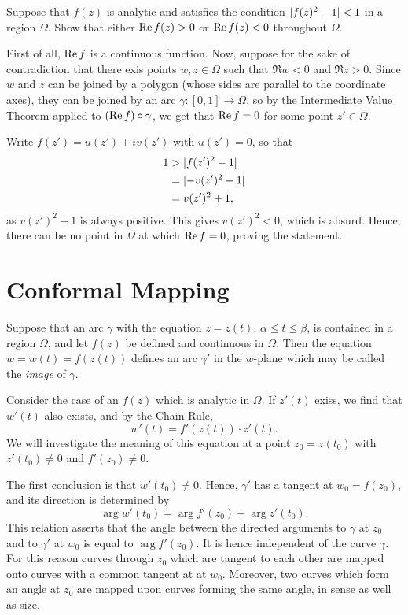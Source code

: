 \begin{exercise}
	Suppose that $f(z)$ is analytic and satisfies the condition $\lvert f(z)^2-1 \rvert<1$ in a region $\Omega$. Show that either $\operatorname{Re} f(z)>0$ or $\operatorname{Re} f(z)<0$ throughout $\Omega$.
	
	\begin{sol}
		First of all, $\operatorname{Re} f$ is a continuous function. Now, suppose for the sake of contradiction that there exis points $w,z \in \Omega$ such that $\Re w<0$ and $\Re z>0$. Since $w$ and $z$ can be joined by a polygon (whose sides are parallel to the coordinate axes), they can be joined by an arc $\gamma \colon [0,1] \rightarrow \Omega$, so by the Intermediate Value Theorem applied to $(\operatorname{Re} f) \circ \gamma$, we get that $\operatorname{Re} f=0$ for some point $z' \in \Omega$.
		
		Write $f(z')=u(z')+iv(z')$ with $u(z')=0$, so that
		\begin{align*}
			1 &>\lvert f(z')^2-1 \rvert \\
			&=\lvert -v(z')^2-1 \rvert \\
			&=v(z')^2+1,
		\end{align*}
		as $v(z')^2+1$ is always positive. This gives $v(z')^2<0$, which is absurd. Hence, there can be no point in $\Omega$ at which $\operatorname{Re} f=0$, proving the statement.
	\end{sol}
\end{exercise}

\section{Conformal Mapping}
Suppose that an arc $\gamma$ with the equation $z=z(t)$, $\alpha \le t \le \beta$, is contained in a region $\Omega$, and let $f(z)$ be defined and continuous in $\Omega$. Then the equation $w=w(t)=f(z(t))$ defines an arc $\gamma'$ in the $w$-plane which may be called the \emph{image} of $\gamma$.

Consider the case of an $f(z)$ which is analytic in $\Omega$. If $z'(t)$ exiss, we find that $w'(t)$ also exists, and by the Chain Rule, $$w'(t)=f'(z(t)) \cdot z'(t).$$ We will investigate the meaning of this equation at a point $z_0=z(t_0)$ with $z'(t_0) \neq 0$ and $f'(z_0) \neq 0$.

The first conclusion is that $w'(t_0) \neq 0$. Hence, $\gamma'$ has a tangent at $w_0=f(z_0)$, and its direction is determined by $$\arg w'(t_0)=\arg f'(z_0)+\arg z'(t_0).$$ This relation asserts that the angle between the directed arguments to $\gamma$ at $z_0$ and to $\gamma'$ at $w_0$ is equal to $\arg f'(z_0)$. It is hence independent of the curve $\gamma$. For this reason curves through $z_0$ which are tangent to each other are mapped onto curves with a common tangent at at $w_0$. Moreover, two curves which form an angle at $z_0$ are mapped upon curves forming the same angle, in sense as well as size.

